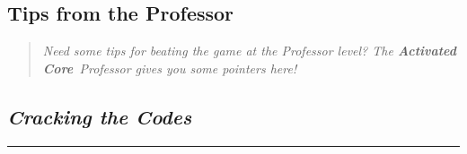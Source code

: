 \documentclass[a5paper, 10pt, titlepage, landscape, twoside, final]{article}
\newcommand{\ac}{\textbf{Activated Core}}
\begin{document}
\clearpage
\begin{center}
\section{Tips from the Professor}
\end{center}
%
\begin{quote}
  \centering
  \large{\textit{Need some tips for beating the game at the Professor level? The \ac\ Professor gives you some pointers here!}}
\end{quote}

\begin{center}
\subsection{\textit{Cracking the Codes}}
\end{center}
\hrule\par
%
\end{document}

